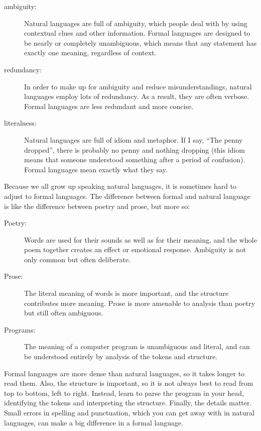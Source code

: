 \documentclass[10pt]{book}
\begin{document}
\begin{description}

\item[ambiguity:] Natural languages are full of ambiguity, which
people deal with by using contextual clues and other information.
Formal languages are designed to be nearly or completely unambiguous,
which means that any statement has exactly one meaning,
regardless of context.

\item[redundancy:] In order to make up for ambiguity and reduce
misunderstandings, natural languages employ lots of
redundancy.  As a result, they are often verbose.  Formal languages
are less redundant and more concise.

\item[literalness:] Natural languages are full of idiom and metaphor.
If I say, ``The penny dropped'', there is probably no penny and
nothing dropping (this idiom means that someone understood something
after a period of confusion).  Formal languages
mean exactly what they say.

\end{description}

Because we all grow up speaking natural languages, it is sometimes
hard to adjust to formal languages.  The difference between formal and
natural language is like the difference between poetry and prose, but
more so:  

\begin{description}

\item[Poetry:] Words are used for their sounds as well as for
their meaning, and the whole poem together creates an effect or
emotional response.  Ambiguity is not only common but often
deliberate.

\item[Prose:] The literal meaning of words is more important,
and the structure contributes more meaning.  Prose is more amenable to
analysis than poetry but still often ambiguous.

\item[Programs:] The meaning of a computer program is unambiguous
and literal, and can be understood entirely by analysis of the
tokens and structure.

\end{description}

Formal languages are more dense
than natural languages, so it takes longer to read them.  Also, the
structure is important, so it is not always best to read
from top to bottom, left to right.  Instead, learn to parse the
program in your head, identifying the tokens and interpreting the
structure.  Finally, the details matter.  Small errors in
spelling and punctuation, which you can get away
with in natural languages, can make a big difference in a formal
language.
\end{document}
